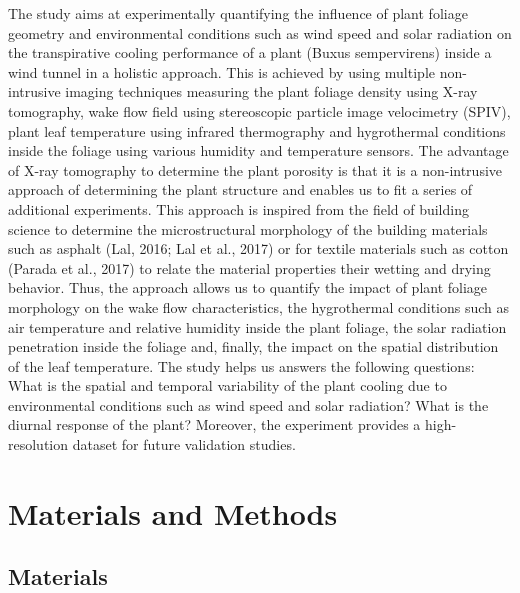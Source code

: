 The study aims at experimentally quantifying the influence of plant foliage geometry and environmental conditions such as wind speed and solar radiation on the transpirative cooling performance of a plant (Buxus sempervirens) inside a wind tunnel in a holistic approach. This is achieved by using multiple non-intrusive imaging techniques measuring the plant foliage density using X-ray tomography, wake flow field using stereoscopic particle image velocimetry (SPIV), plant leaf temperature using infrared thermography and hygrothermal conditions inside the foliage using various humidity and temperature sensors. The advantage of X-ray tomography to determine the plant porosity is that it is a non-intrusive approach of determining the plant structure and enables us to fit a series of additional experiments. This approach is inspired from the field of building science to determine the microstructural morphology of the building materials such as asphalt (Lal, 2016; Lal et al., 2017) or for textile materials such as cotton (Parada et al., 2017) to relate the material properties their wetting and drying behavior. Thus, the approach allows us to quantify the impact of plant foliage morphology on the wake flow characteristics, the hygrothermal conditions such as air temperature and relative humidity inside the plant foliage, the solar radiation penetration inside the foliage and, finally, the impact on the spatial distribution of the leaf temperature. The study helps us answers the following questions: What is the spatial and temporal variability of the plant cooling due to environmental conditions such as wind speed and solar radiation? What is the diurnal response of the plant? Moreover, the experiment provides a high-resolution dataset for future validation studies.


\section{Materials and Methods}

\subsection{Materials}


